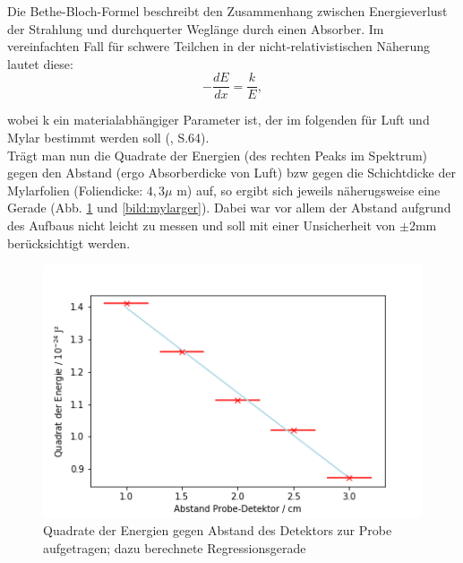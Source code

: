 Die Bethe-Bloch-Formel beschreibt den Zusammenhang zwischen Energieverlust der Strahlung und durchquerter Weglänge durch einen Absorber. 
Im vereinfachten Fall für schwere Teilchen in der nicht-relativistischen Näherung lautet diese: \\

\begin{equation}
    - \frac{dE}{dx} = \frac{k}{E}, 
\end{equation}

wobei k ein materialabhängiger Parameter ist, der im folgenden für Luft und Mylar bestimmt werden soll (\cite{Jaekel1997}, S.64).\\

Trägt man nun die Quadrate der Energien (des rechten Peaks im Spektrum) gegen den Abstand (ergo Absorberdicke von Luft) bzw 
gegen die Schichtdicke der Mylarfolien (Foliendicke: $4,3 \mu$ m) auf, so ergibt sich jeweils näherugsweise eine Gerade (Abb. \ref{bild:luftger} 
und \ref{bild:mylarger}). Dabei war vor allem der Abstand aufgrund des Aufbaus nicht leicht zu messen und soll mit einer Unsicherheit 
von $\pm 2$mm berücksichtigt werden.\\

\begin{figure}[h]
    \centering
    \includegraphics[scale=0.75]{Bilder/luftger.png}
    \caption{Quadrate der Energien gegen Abstand des Detektors zur Probe aufgetragen; dazu berechnete Regressionsgerade}
    \label{bild:luftger}
\end{figure}

